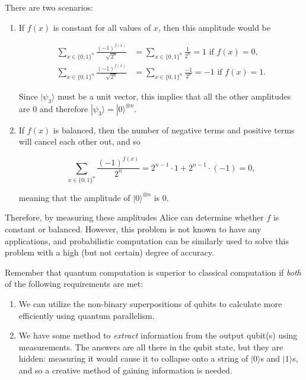 \documentclass{article}
\theoremstyle{definition}
\begin{document}
    There are two scenarios: 
    \begin{enumerate}
      \item If $f(x)$ is constant for all values of $x$, then this amplitude would be 

      \begin{align*} 
        \sum_{x \in \{0, 1\}^n} \frac{(-1)^{f(x)}}{\sqrt{2^n}} & = \sum_{x \in \{0, 1\}^n} \frac{1}{2^n} = 1 \text{ if } f(x) = 0, \\
        \sum_{x \in \{0, 1\}^n} \frac{(-1)^{f(x)}}{\sqrt{2^n}} & = \sum_{x \in \{0, 1\}^n} \frac{-1}{2^n} = -1 \text{ if } f(x) = 1.
      \end{align*}

      Since $|\psi_3 \rangle$ must be a unit vector, this implies that all the other amplitudes are $0$ and therefore $|\psi_3 \rangle = |0\rangle^{\otimes n}$. 

      \item If $f(x)$ is balanced, then the number of negative terms and positive terms will cancel each other out, and so 

        \[\sum_{x \in \{0, 1\}^n} \frac{(-1)^{f(x)}}{2^n} = 2^{n-1} \cdot 1 + 2^{n-1} \cdot (-1) = 0,\]

      meaning that the amplitude of $|0\rangle^{\otimes n}$ is $0$. 
    \end{enumerate}

    Therefore, by measuring these amplitudes Alice can determine whether $f$ is constant or balanced. However, this problem is not known to have any applications, and probabilistic computation can be similarly used to solve this problem with a high (but not certain) degree of accuracy. 

    Remember that quantum computation is superior to classical computation if \textit{both} of the following requirements are met: 

    \begin{enumerate}
      \item We can utilize the non-binary superpositions of qubits to calculate more efficiently using quantum parallelism. 
      \item We have some method to \textit{extract} information from the output qubit(s) using measurements. The answers are all there in the qubit state, but they are hidden: measuring it would cause it to collapse onto a string of $|0\rangle$s and $|1\rangle$s, and so a creative method of gaining information is needed. 
    \end{enumerate}
\end{document}
